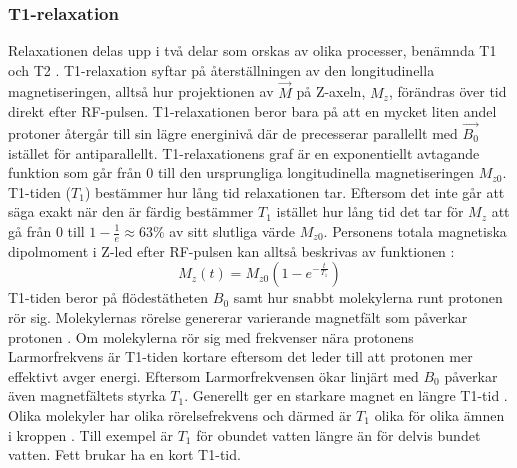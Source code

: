 \documentclass[11pt, a4paper]{article}
\begin{document}
\subsubsection{T1-relaxation}
Relaxationen delas upp i två delar som orskas av olika processer, benämnda T1 och T2 \parencite{understanding_mri}. T1-relaxation syftar på återställningen av den longitudinella magnetiseringen, alltså hur projektionen av $\vec{M}$ på Z-axeln, $M_z$, förändras över tid direkt efter RF-pulsen. T1-relaxationen beror bara på att en mycket liten andel protoner återgår till sin lägre energinivå där de precesserar parallellt med $\vec{B_0}$ istället för antiparallellt. T1-relaxationens graf är en exponentiellt avtagande funktion som går från $0$ till den ursprungliga longitudinella magnetiseringen $M_{z0}$. T1-tiden ($T_1$) bestämmer hur lång tid relaxationen tar. Eftersom det inte går att säga exakt när den är färdig bestämmer $T_1$ istället hur lång tid det tar för $M_z$ att gå från 0 till $1-\frac{1}{e}\approx63\%$ av sitt slutliga värde $M_{z0}$. Personens totala magnetiska dipolmoment i Z-led efter RF-pulsen kan alltså beskrivas av funktionen \parencite{t1_relaxation}: 
\begin{equation}
	M_z(t)=M_{z0}(1-e^{-\frac{t}{T_1}})	
\end{equation}
T1-tiden beror på flödestätheten $B_0$ samt hur snabbt molekylerna runt protonen rör sig. Molekylernas rörelse genererar varierande magnetfält som påverkar protonen \parencite{understanding_mri}. Om molekylerna rör sig med frekvenser nära protonens Larmorfrekvens är T1-tiden kortare eftersom det leder till att protonen mer effektivt avger energi. Eftersom Larmorfrekvensen ökar linjärt med $B_0$ påverkar även magnetfältets styrka $T_1$. Generellt ger en starkare magnet en längre T1-tid \parencite{t1_relaxation}. Olika molekyler har olika rörelsefrekvens och därmed är $T_1$ olika för olika ämnen i kroppen \parencite{understanding_mri}. Till exempel är $T_1$ för obundet vatten längre än för delvis bundet vatten. Fett brukar ha en kort T1-tid.
\end{document}
